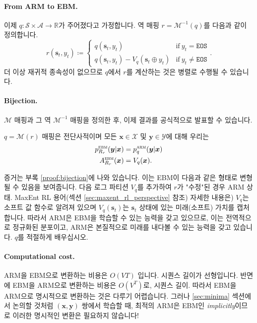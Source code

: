 \documentclass{article}
\def\s{{\bm{s}}}
\def\x{{\bm{x}}}
\def\y{{\bm{y}}}
\def\RR{{\mathbb{R}}}
\def\cA{{\mathcal{A}}}
\def\cM{{\mathcal{M}}}
\def\cS{{\mathcal{S}}}
\def\cX{{\mathcal{X}}}
\def\cY{{\mathcal{Y}}}
\newcommand{\Rsub}[1]{R_{#1}}
\def\arm{{\textsc{arm}}}
\def\ebm{{\textsc{ebm}}}
\def\eos{\texttt{EOS}\xspace}
\def\augvoc{\cA}
\begin{document}
\paragraph{From ARM to EBM.}

이제 $q \colon \cS \times \augvoc \to \RR$가 주어졌다고 가정합니다. 
역 매핑 $r = \cM^{-1}(q)$를 다음과 같이 정의합니다.
 \begin{equation} 
r( \s _t, y_t) \coloneqq 
 \begin{cases} 
q( \s _t, y_t) & \mbox{if} ~ y_t = \eos \\
q( \s _t, y_t) - V_q( \s _t \oplus y_t) & \mbox{if} ~ y_t \neq \eos 
 \end{cases} .
 \label{eq:r_from_q} 
 \end{equation} 
더 이상 재귀적 종속성이 없으므로
$q$에서 $r$를 계산하는 것은 병렬로 수행될 수 있습니다.

\paragraph{Bijection.}

$\cM$ 매핑과 그 역 $\cM^{-1}$ 매핑을 정의한 후,
이제 결과를 공식적으로 발표할 수 있습니다.

\begin{proposition}  \label{prop:bijection} 
$q = \cM(r)$ 매핑은 전단사적이며
모든 $\x \in \cX$ 및 $\y \in \cY$에 대해 우리는
 \begin{align} 
    p^ \ebm _{ \Rsub{r} }( \y | \x ) &= p^ \arm _q( \y | \x ) \\
    A^ \ebm _{ \Rsub{r} }( \x ) &= V_q( \x ).
 \end{align} 
 \end{proposition} 
증거는 부록 \ref{proof:bijection}에 나와 있습니다.
이는 EBM이 다음과 같은 형태로 변형될 수 있음을 보여줍니다.
다음 로그 파티션 $V_q$를 추가하여 $r$가 "수정"된 경우 ARM
상태.  MaxEnt RL 용어(섹션 \ref{sec:maxent_rl_perspective} 참조) 
자세한 내용은) $V_q$는 소프트 값 함수로 알려져 있으며 $V_q(\s_t)$는 
$\s_t$ 상태에 있는 미래(소프트) 가치를 캡처합니다. 
따라서 ARM은 EBM을 학습할 수 있는 능력을 갖고 있으므로,
이는 전역적으로 정규화된 분포이고,
ARM은 본질적으로 미래를 내다볼 수 있는 능력을 갖고 있습니다.
$q$를 적절하게 배우십시오.

\paragraph{Computational cost.}

ARM을 EBM으로 변환하는 비용은 $O(VT)$ 입니다.
시퀀스 길이가 선형입니다. 
반면에 EBM을 ARM으로 변환하는 비용은 $O(V^T)$로,
시퀀스 길이. 따라서 EBM을 ARM으로 명시적으로 변환하는 것은 다루기 어렵습니다.
그러나 \ref{sec:minima} 섹션에서 논의할 것처럼 $(\x, \y)$ 쌍에서 학습할 때,
최적의 ARM은 EBM인 \textit{implicitly}이므로 이러한 명시적인 변환은 필요하지 않습니다!
\end{document}
